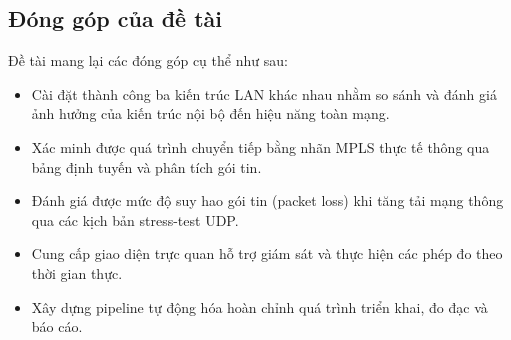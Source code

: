 \subsection{Đóng góp của đề tài}

Đề tài mang lại các đóng góp cụ thể như sau:
\begin{itemize}
    \item Cài đặt thành công ba kiến trúc LAN khác nhau nhằm so sánh và đánh giá ảnh hưởng của kiến trúc nội bộ đến hiệu năng toàn mạng.
    \item Xác minh được quá trình chuyển tiếp bằng nhãn MPLS thực tế thông qua bảng định tuyến và phân tích gói tin.
    \item Đánh giá được mức độ suy hao gói tin (packet loss) khi tăng tải mạng thông qua các kịch bản stress-test UDP.
    \item Cung cấp giao diện trực quan hỗ trợ giám sát và thực hiện các phép đo theo thời gian thực.
    \item Xây dựng pipeline tự động hóa hoàn chỉnh quá trình triển khai, đo đạc và báo cáo.
\end{itemize}
